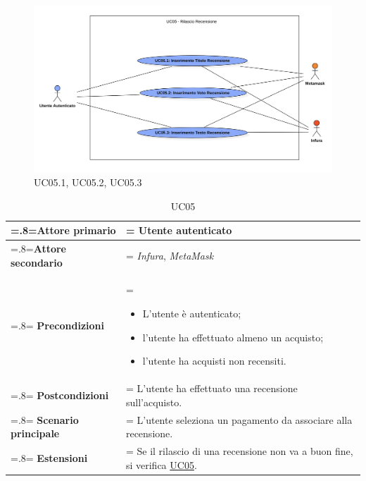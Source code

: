             \begin{figure}[H]
                \centering
                \includegraphics[scale=0.4]{src/img/UC05.X.png}
                \caption{UC05.1, UC05.2, UC05.3}
            \end{figure}

            \begin{table}[H]
                \centering
                \renewcommand{\arraystretch}{1.8}
                \renewcommand\tabularxcolumn[1]{m{#1}}
                \begin{tabularx}{0.9\textwidth}{
                    >{\hsize=.8\hsize\linewidth=\hsize}X
                    >{\hsize=1.2\hsize\linewidth=\hsize}X}
                    \hline
                    \textbf{Attore primario} & Utente autenticato \\
                    \hline
                    \textbf{Attore secondario} & \textit{Infura}, \textit{MetaMask} \\
                    \hline
                    \textbf{Precondizioni} &
                        \begin{itemize}
                            \item L'utente è autenticato;
                            \item l'utente ha effettuato almeno un acquisto;
                            \item l'utente ha acquisti non recensiti.
                        \end{itemize} \\
                    \hline
                    \textbf{Postcondizioni} & L'utente ha effettuato una recensione sull'acquisto. \\
                    \hline
                    \textbf{Scenario principale} &
                    L'utente seleziona un pagamento da associare alla recensione.\\
                    \hline
                    \textbf{Estensioni} & Se il rilascio di una recensione non va a buon fine, si verifica \hyperref[UC05]{UC05}. \\
                    \hline
                \end{tabularx}
                \caption{UC05}
            \end{table}

